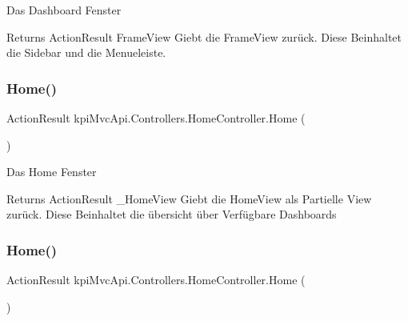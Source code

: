 Das Dashboard Fenster 

\begin{DoxyReturn}{Returns}
{\ttfamily Action\+Result Frame\+View} Giebt die Frame\+View zurück. Diese Beinhaltet die Sidebar und die Menueleiste. 
\end{DoxyReturn}
\mbox{\label{classkpi_mvc_api_1_1_controllers_1_1_home_controller_a71cc0c383f8e44677455f0caf590e0a7}} 
\subsubsection{\texorpdfstring{Home()}{Home()}\hspace{0.1cm}{\footnotesize\ttfamily [1/2]}}
{\footnotesize\ttfamily Action\+Result kpi\+Mvc\+Api.\+Controllers.\+Home\+Controller.\+Home (\begin{DoxyParamCaption}{ }\end{DoxyParamCaption})\hspace{0.3cm}{\ttfamily [inline]}}



Das Home Fenster 

\begin{DoxyReturn}{Returns}
{\ttfamily Action\+Result \+\_\+\+Home\+View} Giebt die Home\+View als Partielle View zurück. Diese Beinhaltet die übersicht über Verfügbare Dashboards 
\end{DoxyReturn}
\mbox{\label{classkpi_mvc_api_1_1_controllers_1_1_home_controller_a71cc0c383f8e44677455f0caf590e0a7}} 
\subsubsection{\texorpdfstring{Home()}{Home()}\hspace{0.1cm}{\footnotesize\ttfamily [2/2]}}
{\footnotesize\ttfamily Action\+Result kpi\+Mvc\+Api.\+Controllers.\+Home\+Controller.\+Home (\begin{DoxyParamCaption}{ }\end{DoxyParamCaption})\hspace{0.3cm}{\ttfamily [inline]}}



